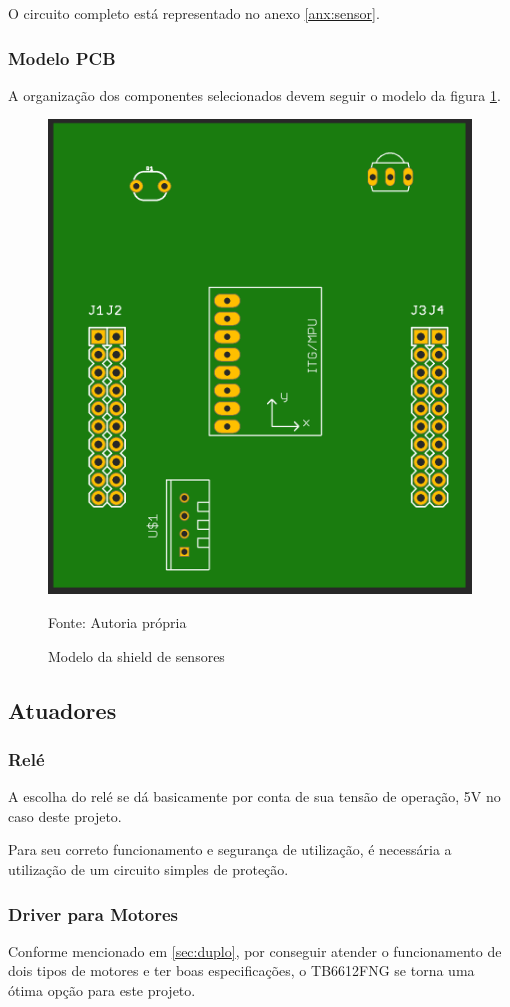 O circuito completo está representado no anexo \ref{anx:sensor}.

\subsubsection{Modelo PCB}

A organização dos componentes selecionados devem seguir o modelo da figura \ref{fig:sensores_pcb}.

\begin{figure}[h!]
  \centering
    \includegraphics[width=.5\textwidth]{figuras/sensores_pcb.png}
    \caption{Modelo da shield de sensores} Fonte: Autoria própria
    \label{fig:sensores_pcb}
\end{figure}

\subsection{Atuadores}

\subsubsection*{Relé}

A escolha do relé se dá basicamente por conta de sua tensão de operação, 5V no caso deste projeto.

Para seu correto funcionamento e segurança de utilização, é necessária a utilização de um circuito simples de proteção.

\subsubsection*{Driver para Motores}

Conforme mencionado em \ref{sec:duplo}, por conseguir atender o funcionamento de dois tipos de motores e ter boas especificações, o TB6612FNG se torna uma ótima opção para este projeto.

